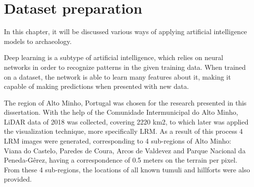
\chapter{Dataset preparation}

\begin{introduction}
In this chapter, it will be discussed various ways of applying artificial intelligence models to archaeology.
\end{introduction}





Deep learning is a subtype of artificial intelligence, which relies on neural networks in order to recognize patterns in the given training data. When trained on a dataset, the network is able to learn many features about it, making it capable of making predictions when presented with new data.



%
%

The region of Alto Minho, Portugal was chosen for the research presented in this dissertation. With the help of the Comunidade Intermunicipal do Alto Minho\cite{comunidadeAltoMinho}, LiDAR data of 2018 was collected, covering 2220 km2, to which later was applied the visualization technique, more specifically LRM. As a result of this process 4 LRM images were generated, corresponding to 4 sub-regions of Alto Minho: Viana do Castelo, Paredes de Coura, Arcos de Valdevez and Parque Nacional da Peneda-Gêrez, having a correspondence of 0.5 meters on the terrain per pixel.
From these 4 sub-regions, the locations of all known tumuli and hillforts were also provided.

